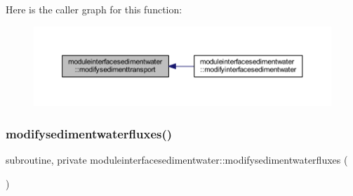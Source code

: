 Here is the caller graph for this function\+:\nopagebreak
\begin{figure}[H]
\begin{center}
\leavevmode
\includegraphics[width=350pt]{namespacemoduleinterfacesedimentwater_af8d259ce72d65a152ca86349e82463f1_icgraph}
\end{center}
\end{figure}
\mbox{\label{namespacemoduleinterfacesedimentwater_a3c912328a57c38e146a0449318c3ace0}} 
\subsubsection{\texorpdfstring{modifysedimentwaterfluxes()}{modifysedimentwaterfluxes()}}
{\footnotesize\ttfamily subroutine, private moduleinterfacesedimentwater\+::modifysedimentwaterfluxes (\begin{DoxyParamCaption}{ }\end{DoxyParamCaption})\hspace{0.3cm}{\ttfamily [private]}}

